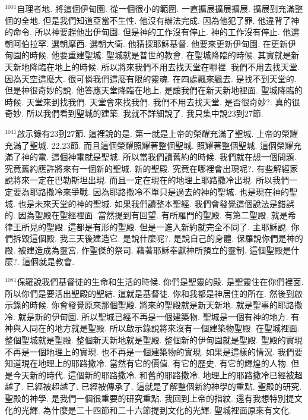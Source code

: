 \documentclass{book}
\begin{document}
$^{1001}$自理者地.
將這個伊甸園.
從一個很小的範圍.
一直擴展擴展擴展.
擴展到充滿整個的全地.
但是我們知道亞當不生性.
他沒有辦法完成.
因為他犯了罪.
他違背了神的命令.
所以神要趕他出伊甸園.
但是神的工作沒有停止.
神的工作沒有停止.
他選朝阿伯拉罕.
選朝摩西.
選朝大衛.
他猜探耶穌基督.
他要來更新伊甸園.
在更新伊甸園的時候.
他要重建聖城.
聖城就是普世的教會.
在聖城降臨的時候.
其實就是新天新地降臨在地上的時候.
所以將來我們不用去找天堂在哪裡.
我們不用去找天堂.
因為天空這麼大.
很可憐我們這麼有限的靈魂.
在四處飄來飄去.
是找不到天堂的.
但是神很奇妙的說.
他答應天堂降臨在地上.
是讓我們在新天新地裡面.
聖城降臨的時候.
天堂來到找我們.
天堂會來找我們.
我們不用去找天堂.
是否很奇妙?.
真的很奇妙.
所以我們看到聖城的建築.
我就不詳細說了.
我只集中說23到27節.

$^{1041}$啟示錄有23到27節.
這裡說的是.
第一就是上帝的榮耀充滿了聖城.
上帝的榮耀充滿了聖城.
22,23節.
而且這個榮耀照耀著整個聖城.
照耀著整個聖城.
這個榮耀充滿了神的電.
這個神電就是聖城.
所以當我們讀舊約的時候.
我們就在想一個問題.
究竟舊約應許將來有一個新的聖城.
新的聖殿.
究竟在哪裡會出現呢?.
有些解經家說將來一定在巴勒斯坦出現.
而且一定在現在的地理上耶路撒冷出現.
所以我們一定要為耶路撒冷來爭戰.
因為耶路撒冷不單只是過去的神的聖城.
也是現在神的聖城.
也是未來天堂的神的聖城.
如果我們讀整本聖經.
我們會發覺這個說法是錯誤的.
因為聖殿在聖經裡面.
當然提到有回望.
有所羅門的聖殿.
有第二聖殿.
就是希律王所見的聖殿.
這都是有形的聖殿.
但是一進入新約就完全不同了.
主耶穌說.
你們拆毀這個殿.
我三天後建造它.
是說什麼呢?.
是說自己的身體.
保羅說你們是神的殿.
被建造成為靈宮.
作聖傑的祭司.
藉著耶穌奉獻神所預立的靈制.
這個聖殿是什麼?.
這個就是教會.

$^{1081}$保羅說我們基督徒的生命和生活的時候.
你們是聖靈的殿.
是聖靈住在你們裡面.
所以你們是要活出聖殿的聖結.
這就是基督徒.
你和我都是神居住的所在.
然後到啟示錄的時候.
你會發覺原來那個聖殿.
將來的聖殿就是新天新地.
就是聖事的耶路撒冷.
就是新的伊甸園.
所以聖城已經不再是一個建築物.
聖城是一個有神的地方.
有神與人同在的地方就是聖殿.
所以啟示錄說將來沒有一個建築物聖殿.
在聖城裡面.
整個聖城就是聖殿.
整個新天新地就是聖殿.
整個新的伊甸園就是聖殿.
聖殿的實現不再是一個地理上的實現.
也不再是一個建築物的實現.
如果是這樣的情況.
我們要知道現在地理上的耶路撒冷.
當然有它的價值.
有它的歷史.
有它的輝煌的人物.
但是今天新的時代.
這個新的耶路撒冷.
和舊的耶路撒冷.
地理上的耶路撒冷已經被超越了.
已經被超越了.
已經被傳承了.
這就是了解整個新約神學的重點.
聖殿的研究.
聖殿的神學.
是我們一個很重要的研究重點.
我回到上帝的指紋.
還有我想特別提文化的光輝.
為什麼是二十四節和二十六節提到文化的光輝.
聖城裡面原來有文化.
\end{document}
